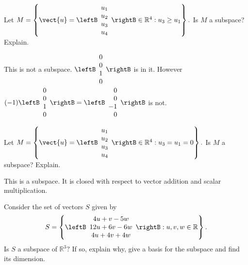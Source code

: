 \begin{enumialphparenastyle}
\begin{ex} Let $M=\left\{ \vect{u}=\leftB 
\begin{array}{c}
u_{1} \\
u_{2} \\
u_{3} \\
u_{4}
\end{array}
\rightB \in 
\mathbb{R}^{4}:u_{3}\geq u_{1}\right\} .$ Is $M$ a subspace? Explain.
\begin{sol}
This
is not a subspace. $\leftB \begin{array}{r}
0 \\
0 \\
1 \\
0
\end{array}
\rightB $ is in it. However $(-1) \leftB \begin{array}{r}
0 \\
0 \\
1 \\
0
\end{array}
\rightB  = \leftB \begin{array}{r}
0 \\
0 \\
-1 \\
0
\end{array}
\rightB $ is not.
\end{sol}
\end{ex}

\begin{ex} Let $M=\left\{ \vect{u}=\leftB 
\begin{array}{c}
u_{1} \\
u_{2} \\
u_{3} \\
u_{4}
\end{array}\rightB \in 
\mathbb{R}^{4}:u_{3}=u_{1}=0\right\} .$ Is $M$ a subspace? Explain.
\begin{sol}
This is a subspace. It is closed with respect to vector addition and scalar
multiplication.
\end{sol}
\end{ex}

\begin{ex} Consider the set of vectors $S$ given by  
\begin{equation*}
S = 
\left\{ \leftB
\begin{array}{c}
4u+v-5w \\ 
12u+6v-6w \\ 
4u+4v+4w
\end{array}
\rightB :u,v,w\in \mathbb{R}\right\} .
\end{equation*}
Is $S$ a subspace of $\mathbb{R}^{3}?$ If so, explain why,
give a basis for the subspace and find its dimension.
\end{ex}


\end{enumialphparenastyle}
